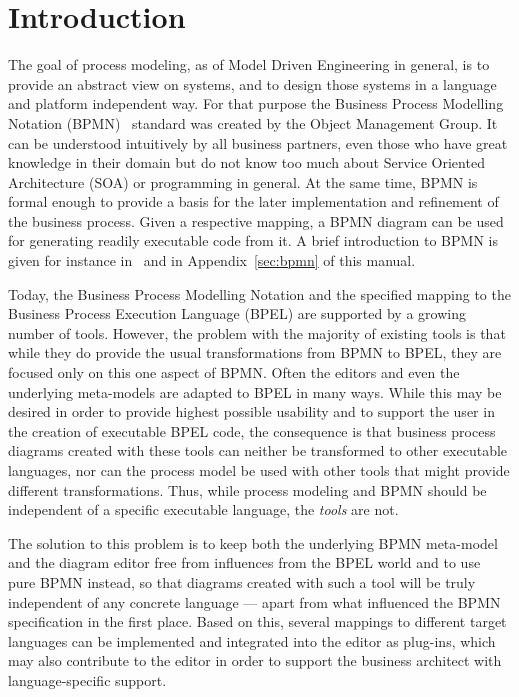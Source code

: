 \chapter{Introduction}


The goal of process modeling, as of Model Driven Engineering in general, is to
provide an abstract view on systems, and to design those systems in a language
and platform independent way.  For that purpose the Business Process Modelling
Notation (BPMN)~\cite{omg2009bpmn} standard was created by the Object Management
Group.  It can be understood intuitively by all business partners, even those who
have great knowledge in their domain but do not know too much about Service
Oriented Architecture (SOA) or programming in general.  At the same time, BPMN is
formal enough to provide a basis for the later implementation and refinement of
the business process.  Given a respective mapping, a BPMN diagram can be used for
generating readily executable code from it.  A brief introduction to BPMN is given
for instance in~\cite{white2004introduction} and in Appendix~\ref{sec:bpmn} of
this manual.

Today, the Business Process Modelling Notation and the specified mapping to the
Business Process Execution Language (BPEL) are supported by a growing number of
tools.  However, the problem with the majority of existing tools is that while
they do provide the usual transformations from BPMN to BPEL, they are focused
only on this one aspect of BPMN.  Often the editors and even the underlying
meta-models are adapted to BPEL in many ways.  While this may be desired in order
to provide highest possible usability and to support the user in the creation of
executable BPEL code, the consequence is that business process diagrams created
with these tools can neither be transformed to other executable languages, nor
can the process model be used with other tools that might provide different
transformations.  Thus, while process modeling and BPMN should be independent of
a specific executable language, the \emph{tools} are not.

The solution to this problem is to keep both the underlying BPMN meta-model and
the diagram editor free from influences from the BPEL world and to use pure BPMN
instead, so that diagrams created with such a tool will be truly independent of
any concrete language --- apart from what influenced the BPMN specification in
the first place.  Based on this, several mappings to different target languages
can be implemented and integrated into the editor as plug-ins, which may also
contribute to the editor in order to support the business architect with
language-specific support.

